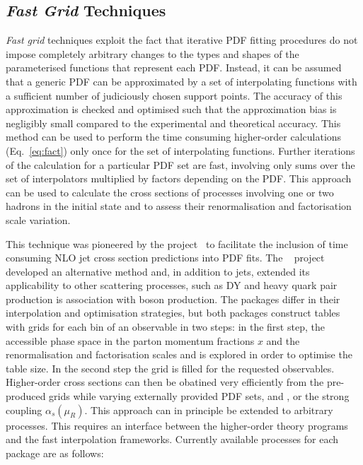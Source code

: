\subsection{\emph{Fast Grid} Techniques}

  \emph{Fast grid} techniques exploit the fact that iterative PDF fitting
  procedures do not impose completely arbitrary changes to the types
  and shapes of the parameterised functions that represent each PDF\@.
  Instead, it can be assumed that a generic PDF can be approximated by
  a set of interpolating functions with a sufficient number of
 judiciously chosen support points. The 
  accuracy of this approximation is checked and optimised 
 such that the approximation bias is negligibly
  small compared to the experimental and theoretical accuracy. 
   This method can be used to perform
  the time consuming higher-order calculations (Eq.~\ref{eq:fact})
  only once for the set of interpolating functions. 
  Further iterations of the calculation for
  a particular PDF set are fast, involving only sums over
  the set of interpolators multiplied by factors depending on the
  PDF\@. This approach can be used to calculate the cross sections 
  of processes involving one or two hadrons in the initial state and to
  assess their renormalisation and factorisation scale variation.

  This technique was pioneered by the \fastnlo
  project~\cite{Kluge:2006xs} to facilitate the inclusion of
   time consuming NLO jet cross section predictions into PDF fits.
  The \applgrid~\cite{Carli:2010rw} project developed an alternative method
  and, in addition to jets, extended its applicability to other scattering processes, 
  such as DY and heavy quark pair production is association with boson production.
  The packages differ in their interpolation
  and optimisation strategies, but both packages construct tables with
  grids for each bin of an observable in two steps: in the first step,
  the accessible phase space in the parton momentum fractions $x$ and
  the renormalisation and factorisation scales \mur and \muf is
  explored in order to optimise the table size. In the second step
  the grid is filled for the
  requested observables. Higher-order cross sections can then be
  obatined very efficiently from the pre-produced grids while varying
  externally provided PDF sets, \mur and \muf, or the strong coupling
  $\alpha_s(\mu_R)$. This approach can in principle be extended to arbitrary
  processes. This requires an interface between the
  higher-order theory programs and the fast interpolation
  frameworks. Currently available processes for each package are as follows:

